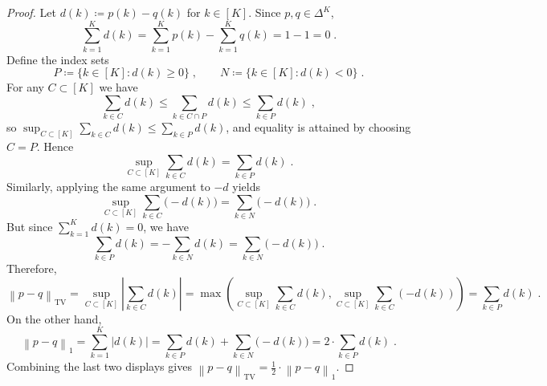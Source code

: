 \documentclass[11pt,oneside,a4paper]{article}
\newcommand{\lrb}[1]{\left(#1\right)}
\newcommand{\brb}[1]{\bigl(#1\bigr)}
\newcommand{\bcb}[1]{\bigl\{#1\bigr\}}
\newcommand{\labs}[1]{\left\lvert#1\right\rvert}
\newcommand{\lno}[1]{\left\lVert#1\right\rVert}
\theoremstyle{plain}
\theoremstyle{definition}
\theoremstyle{remark}
\newcommand{\simplex}[1]{\Delta^{#1}}
\newcommand{\TV}[2]{\lno{ #1 - #2 }_{\textrm{TV}} }
\begin{document}
\begin{proof}
Let $d(k)\coloneqq p(k)-q(k)$ for $k\in[K]$. Since $p,q\in\simplex{K}$,
\[
    \sum_{k=1}^K d(k)
=
    \sum_{k=1}^K p(k)-\sum_{k=1}^K q(k)
=
    1-1
=
    0\;.
\]
Define the index sets
\[
    P\coloneqq \bcb{k\in[K]: d(k)\ge 0}\;,\qquad
    N\coloneqq \bcb{k\in[K]: d(k)<0}\;.
\]
For any $C\subset[K]$ we have
\[
    \sum_{k\in C} d(k)
\le
    \sum_{k\in C\cap P} d(k)
\le
    \sum_{k\in P} d(k)\;,
\]
so $\sup_{C\subset[K]} \sum_{k\in C} d(k)\le \sum_{k\in P} d(k)$, and equality is attained by
choosing $C=P$. Hence
\[
    \sup_{C\subset[K]} \sum_{k\in C} d(k)
=
    \sum_{k\in P} d(k)\;.
\]
Similarly, applying the same argument to $-d$ yields
\[
    \sup_{C\subset[K]} \sum_{k\in C} \brb{-d(k)}
=
    \sum_{k\in N} \brb{-d(k)}\;.
\]
But since $\sum_{k=1}^K d(k)=0$, we have
\[
    \sum_{k\in P} d(k)
=
    -\sum_{k\in N} d(k)
=
    \sum_{k\in N} \brb{-d(k)}\;.
\]
Therefore,
\[
    \TV{p}{q}
=
    \sup_{C\subset[K]}\labs{\sum_{k\in C} d(k)}
=
    \max \lrb{\sup_{C \subset [K]}\sum_{k\in C} d(k),\sup_{C \subset [K]}\sum_{k\in C} \lrb{-d(k)}}
=
\sum_{k\in P} d(k)\;.
\]
On the other hand,
\[
    \lno{p-q}_1
=
    \sum_{k=1}^K \labs{d(k)}
=
    \sum_{k\in P} d(k) + \sum_{k\in N} \brb{-d(k)}
=
    2 \cdot \sum_{k\in P} d(k)\;.
\]
Combining the last two displays gives $\TV{p}{q}=\tfrac12 \cdot \lno{p-q}_1$.
\end{proof}
\end{document}
